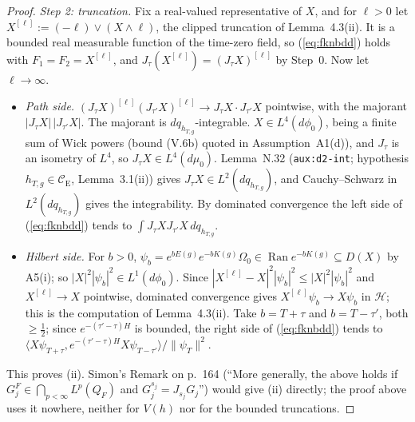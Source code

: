\documentclass[11pt,a4paper]{article}
\newcommand{\CE}{\mathcal{C}_{\mathrm E}}
\newcommand{\HH}{\mathcal{H}}
\newcommand{\Om}{\Omega}
\newcommand{\ip}[2]{\langle #1,#2\rangle}
\DeclareMathOperator{\Ran}{Ran}
\newcommand{\dmu}{d\mu_0}
\newcommand{\dphi}{d\phi_0}
\theoremstyle{plain}
\theoremstyle{definition}
\begin{document}
\begin{proof}
\emph{Step 2: truncation.}  Fix a real-valued representative of $X$, and for $\ell>0$ let
$X^{[\ell]}:=(-\ell)\vee(X\wedge\ell)$, the clipped truncation of Lemma~4.3(ii).  It is a
bounded real measurable function of the time-zero field, so (\ref{eq:fknbdd}) holds with
$F_1=F_2=X^{[\ell]}$, and $J_\tau(X^{[\ell]})=(J_\tau X)^{[\ell]}$ by Step~0.  Now let
$\ell\to\infty$.
\begin{itemize}
\item \emph{Path side.}  $(J_\tau X)^{[\ell]}(J_{\tau'}X)^{[\ell]}\to J_\tau X\cdot J_{\tau'}X$
pointwise, with the majorant $|J_\tau X|\,|J_{\tau'}X|$.  The majorant is
$dq_{h_{T,g}}$-integrable.  $X\in L^4(\dphi)$, being a finite sum of Wick powers (bound (V.6b)
quoted in Assumption~A1(d)), and $J_\tau$ is an isometry of $L^4$, so $J_\tau X\in L^4(\dmu)$.
Lemma~N.32 (\texttt{aux:d2-int}; hypothesis $h_{T,g}\in\CE$, Lemma~3.1(ii)) gives
$J_\tau X\in L^2(dq_{h_{T,g}})$, and Cauchy--Schwarz in $L^2(dq_{h_{T,g}})$ gives the
integrability.  By dominated convergence the left side of (\ref{eq:fknbdd}) tends to
$\int J_\tau XJ_{\tau'}X\,dq_{h_{T,g}}$.
\item \emph{Hilbert side.}  For $b>0$, $\psi_b=e^{bE(g)}e^{-bK(g)}\Om_0\in\Ran e^{-bK(g)}\subseteq
D(X)$ by A5(i); so $|X|^2|\psi_b|^2\in L^1(\dphi)$.  Since $|X^{[\ell]}-X|^2|\psi_b|^2\le
|X|^2|\psi_b|^2$ and $X^{[\ell]}\to X$ pointwise, dominated convergence gives
$X^{[\ell]}\psi_b\to X\psi_b$ in $\HH$; this is the computation of Lemma~4.3(ii).  Take
$b=T+\tau$ and $b=T-\tau'$, both $\ge\frac12$; since $e^{-(\tau'-\tau)H}$ is bounded, the
right side of (\ref{eq:fknbdd}) tends to
$\ip{X\psi_{T+\tau}}{e^{-(\tau'-\tau)H}X\psi_{T-\tau'}}/\|\psi_T\|^2$.
\end{itemize}
This proves (ii).  Simon's Remark on p.~164 (``More generally, the above holds if
$G_j^F\in\bigcap_{p<\infty}L^p(Q_F)$ and $G_j^{s_j}=J_{s_j}G_j$'') would give (ii) directly; the
proof above uses it nowhere, neither for $V(h)$ nor for the bounded truncations.


\end{proof}
\end{document}
